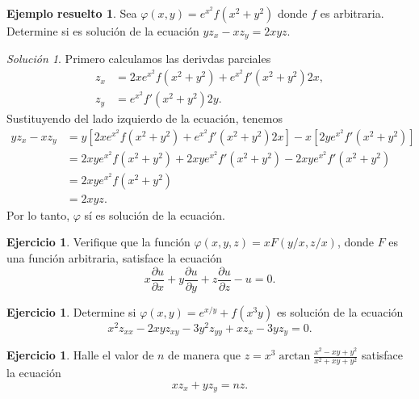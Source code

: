 \documentclass[11pt,letterpaper,draft]{report}
\theoremstyle{plain}
\theoremstyle{definition}
\newtheorem{solved}[theorem]{Ejemplo resuelto}
\newtheorem{exercise}[theorem]{Ejercicio}
\theoremstyle{remark}
\newtheorem*{solution}{Solución}
\newcommand\<{\langle}
\renewcommand\>{\rangle}
\renewcommand\phi\varphi
\begin{document}
\begin{solved}
  Sea $\phi(x,y) = e^{x^2}f(x^2+y^2)$ donde $f$ es
  arbitraria. Determine si es solución de la ecuación $y z_x - x z_y = 2xyz$.
  
  \begin{solution}
    Primero calculamos las derivdas parciales
    \begin{align*}
      z_x &= 2x e^{x^2} f(x^2 + y^2) + e^{x^2} f'(x^2 +y^2)2x, \\
      z_y &= e^{x^2} f'(x^2+y^2)2y.
    \end{align*} 
    Sustituyendo del lado izquierdo de la ecuación, tenemos
    \begin{align*}
      y z_x - x z_y 
      &= y\left[2x e^{x^2} f(x^2+y^2) + e^{x^2} f'(x^2+y^2) 2x\right]
      - x\left[2y e^{x^2} f'(x^2+y^2)\right]
      \\
      &= 2xy e^{x^2} f(x^2+y^2) + 2xy e^{x^2} f'(x^2+y^2) - 2xy
      e^{x^2} f'(x^2+y^2) \\
      &= 2xy e^{x^2} f(x^2+y^2) \\
      &= 2xyz.
    \end{align*}
    Por lo tanto, $\phi$ sí es solución de la ecuación.
  \end{solution}
\end{solved}

\begin{exercise}
  Verifique que la función \(\phi(x,y,z)=xF(y / x, z / x)\), donde
  \(F\) es una función arbitraria, satisface la ecuación
  \begin{equation}
    x \frac{\partial u}{\partial x}
    + y \frac{\partial u}{\partial y}
    + z \frac{\partial u}{\partial z}
    - u = 0
  .\end{equation}
\end{exercise}

\begin{exercise}
  Determine si \(\phi(x,y) = e^{x / y}+f(x^{3}y)\) es solución de la
  ecuación
  \begin{equation}
    x^{2}z_{xx} - 2xyz_{xy} - 3y^{2}z_{yy}
    +xz_x - 3yz_y = 0
  .\end{equation}
\end{exercise}

\begin{exercise}
  Halle el valor de \(n\) de manera que \(z=x^{3}\arctan
  \frac{x^{2}-xy+y^{2}}{x^{2}+xy+y^{2}}\) satisface la ecuación
  \begin{equation}
    xz_x + yz_y = nz
  .\end{equation}
\end{exercise}
\end{document}
